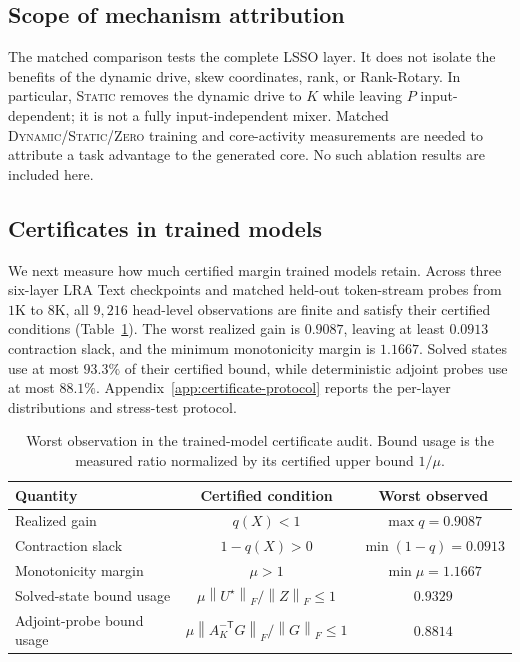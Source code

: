 \documentclass[10pt]{article}
\newcommand{\T}{\mathsf{T}}
\newcommand{\norm}[1]{\left\lVert #1 \right\rVert}
\begin{document}
\subsection{Scope of mechanism attribution}
The matched comparison tests the complete LSSO layer.  It does not isolate the
benefits of the dynamic drive, skew coordinates, rank, or Rank-Rotary.
In particular, \textsc{Static} removes the dynamic drive to $K$ while leaving
$P$ input-dependent; it is not a fully input-independent mixer.  Matched
\textsc{Dynamic}/\textsc{Static}/\textsc{Zero} training and core-activity
measurements are needed to attribute a task advantage to the generated core.
No such ablation results are included here.

\subsection{Certificates in trained models}
\label{sec:certificate-evidence}

We next measure how much certified margin trained models retain.  Across three
six-layer LRA Text checkpoints and matched held-out token-stream probes from
$1$K to $8$K, all $9{,}216$ head-level observations are finite and satisfy
their certified conditions (Table~\ref{tab:certificate-audit}).  The worst
realized gain is $0.9087$, leaving at least $0.0913$ contraction slack, and the
minimum monotonicity margin is $1.1667$.  Solved states use at most $93.3\%$ of
their certified bound, while deterministic adjoint probes use at most $88.1\%$.
Appendix~\ref{app:certificate-protocol} reports the per-layer distributions
and stress-test protocol.

\begin{table}[H]
\centering
\small
\setlength{\tabcolsep}{7pt}
\caption{Worst observation in the trained-model certificate audit.  Bound
usage is the measured ratio normalized by its certified upper bound $1/\mu$.}
\label{tab:certificate-audit}
\begin{tabular}{lcc}
\toprule
Quantity & Certified condition & Worst observed \\
\midrule
Realized gain & $q(X)<1$ & $\max q=0.9087$ \\
Contraction slack & $1-q(X)>0$ & $\min(1-q)=0.0913$ \\
Monotonicity margin & $\mu>1$ & $\min\mu=1.1667$ \\
Solved-state bound usage & $\mu\norm{U^\star}_F/\norm{Z}_F\leq1$ & $0.9329$ \\
Adjoint-probe bound usage & $\mu\norm{A_K^{-\T}G}_F/\norm{G}_F\leq1$ & $0.8814$ \\
\bottomrule
\end{tabular}
\end{table}
\end{document}
